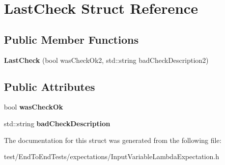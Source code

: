 \hypertarget{structLastCheck}{}\section{Last\+Check Struct Reference}
\label{structLastCheck}
\subsection*{Public Member Functions}
\begin{DoxyCompactItemize}
\item 
{\bfseries Last\+Check} (bool was\+Check\+Ok2, std\+::string bad\+Check\+Description2)\hypertarget{structLastCheck_a2f253ee64a70a0fbe462f56331e93876}{}\label{structLastCheck_a2f253ee64a70a0fbe462f56331e93876}

\end{DoxyCompactItemize}
\subsection*{Public Attributes}
\begin{DoxyCompactItemize}
\item 
bool {\bfseries was\+Check\+Ok}\hypertarget{structLastCheck_a53b8490456d308575df2d4bb496ace90}{}\label{structLastCheck_a53b8490456d308575df2d4bb496ace90}

\item 
std\+::string {\bfseries bad\+Check\+Description}\hypertarget{structLastCheck_ac89c9d27727e315116d2775fa66b76ce}{}\label{structLastCheck_ac89c9d27727e315116d2775fa66b76ce}

\end{DoxyCompactItemize}


The documentation for this struct was generated from the following file\+:\begin{DoxyCompactItemize}
\item 
test/\+End\+To\+End\+Tests/expectations/Input\+Variable\+Lambda\+Expectation.\+h\end{DoxyCompactItemize}
